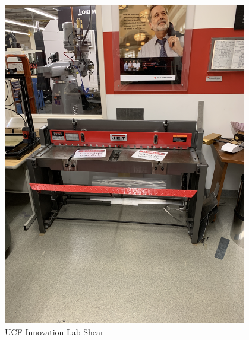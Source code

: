 \begin{figure}[ht]
\centering
\begin{minipage}[b]{.48\textwidth}
  \centering
  \includegraphics[width=0.95\textwidth]{Meetings/November/11-01-21/11-1-21_Hardware_Figure3 - Nathan Forrer.JPG}
  \caption{UCF Innovation Lab Shear}
  \label{fig:pic6}
\end{minipage}%
\hfill%
\begin{minipage}[b]{.48\textwidth}
  \centering

\end{minipage}
\end{figure}

